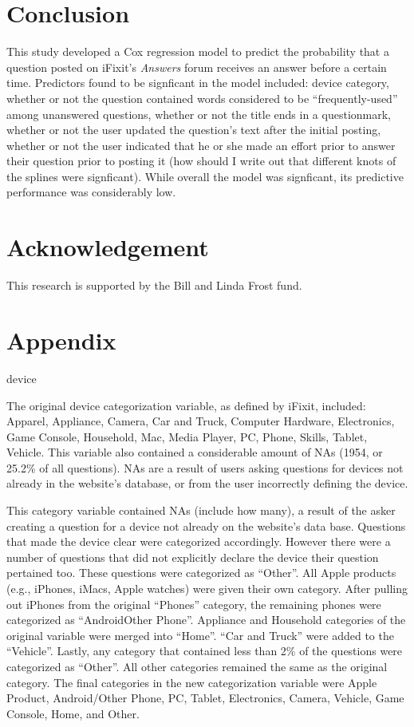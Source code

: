 \documentclass{article}
\begin{document}
\section*{Conclusion}

This study developed a Cox regression model to predict the probability that a question posted on iFixit's \textit{Answers} forum receives an answer before a certain time. Predictors found to be signficant in the model included: device category, whether or not the question contained words considered to be ``frequently-used'' among unanswered questions, whether or not the title ends in a questionmark, whether or not the user updated the question's text after the initial posting, whether or not the user indicated that he or she made an effort prior to answer their question prior to posting it (how should I write out that different knots of the splines were signficant). While overall the model was signficant, its predictive performance was considerably low. 

\section*{Acknowledgement}

This research is supported by the Bill and Linda Frost fund. 

\section{Appendix} 

device

The original device categorization variable, as defined by iFixit, included: Apparel, Appliance, Camera, Car and Truck, Computer Hardware, Electronics, Game Console, Household, Mac, Media Player, PC, Phone, Skills, Tablet, Vehicle. This variable also contained a considerable amount of NAs (1954, or 25.2\% of all questions). NAs are a result of users asking questions for devices not already in the website's database, or from the user incorrectly defining the device. 


This category variable contained NAs (include how many), a result of the asker creating a question for a device not already on the website's data base. Questions that made the device clear were categorized accordingly. However there were a number of questions that did not explicitly declare the device their question pertained too. These questions were categorized as ``Other''. All Apple products (e.g., iPhones, iMacs, Apple watches) were given their own category. After pulling out iPhones from the original ``Phones'' category, the remaining phones were categorized as ``AndroidOther Phone''. Appliance and Household categories of the original variable were merged into ``Home''. ``Car and Truck'' were added to the ``Vehicle''. Lastly, any category that contained less than 2\% of the questions were categorized as ``Other''. All other categories remained the same as the original category. The final categories in the new categorization variable were Apple Product, Android/Other Phone, PC, Tablet, Electronics, Camera, Vehicle, Game Console, Home, and Other. 
\end{document}
